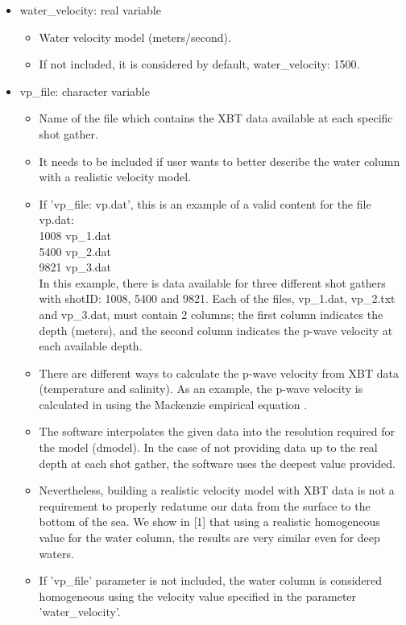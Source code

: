 \documentclass[11pt, oneside]{article}   	%
\begin{document}
\begin{itemize}
\item water\_velocity: real variable 
	\begin{itemize}
	\item Water velocity model (meters/second).
	\item If not included, it is considered by default, water\_velocity: 1500.
	\end{itemize}

\item vp\_file: character variable
	\begin{itemize}
	\item Name of the file which contains the XBT data available at each specific shot gather.
	\item It needs to be included if user wants to better describe the water column with a realistic velocity model.
	\item If 'vp\_file: vp.dat', this is an example of a valid content for the file vp.dat: \\
	
	1008 vp\_1.dat\\
	5400 vp\_2.dat\\
	9821 vp\_3.dat\\
	
	In this example, there is data available for three different shot gathers with shotID: 1008, 5400 and 9821. Each of the files, vp\_1.dat, vp\_2.txt and vp\_3.dat, must contain 2 columns; the first column indicates the depth (meters), and the second column indicates the p-wave velocity at each available depth. 
	\item There are different ways to calculate the p-wave velocity from XBT data (temperature and salinity). As an example, the p-wave velocity is calculated in \cite{estela} using the Mackenzie empirical equation \cite{Mackenzie}.
	\item The software interpolates the given data into the resolution required for the model (dmodel). In the case of not providing data up to the real depth at each shot gather, the software uses the deepest value provided.
	\item Nevertheless, building a realistic velocity model with XBT data is not a requirement to properly redatume our data from the surface to the bottom of the sea. We show in [1] that using a realistic homogeneous value for the water column, the results are very similar even for deep waters.
	\item If 'vp\_file' parameter is not included, the water column is considered homogeneous using the velocity value specified in the parameter 'water\_velocity'.
	\end{itemize}
  

\end{itemize}
\end{document}
